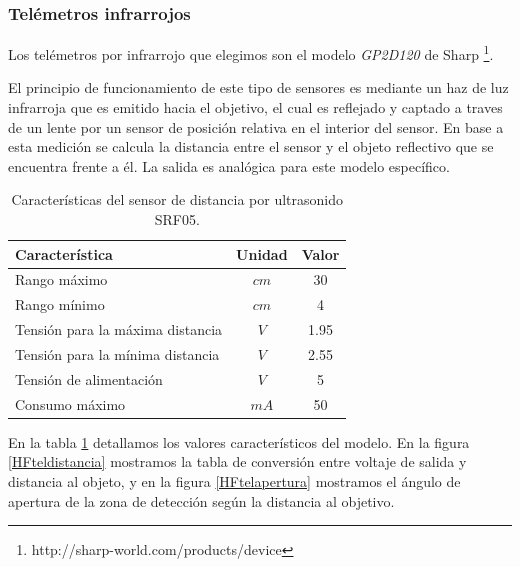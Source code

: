 \subsubsection{Tel\'emetros infrarrojos}
\label{HStelemetros}
	
	Los tel\'emetros por infrarrojo que elegimos son el modelo \emph{GP2D120} de Sharp \footnote{http://sharp-world.com/products/device}.
	
	El principio de funcionamiento de este tipo de sensores es mediante un haz de luz infrarroja que es emitido hacia el objetivo, el cual
	es reflejado y captado a traves de un lente por un sensor de posici\'on relativa en el interior del sensor. En base a esta medici\'on
	se calcula la distancia entre el sensor y el objeto reflectivo que se encuentra frente a \'el. La salida es anal\'ogica para este
	modelo espec\'ifico.
	
	\begin{table}[ht]
		\begin{center}
			\begin{tabular}{|l|c|c|}
				\hline
				Caracter\'istica & Unidad & Valor\\
				\hline
				Rango m\'aximo & $cm$ & 30 \\
				Rango m\'inimo & $cm$ & 4 \\
				Tensi\'on para la m\'axima distancia & $V$ & 1.95 \\
				Tensi\'on para la m\'inima distancia & $V$ & 2.55 \\
				Tensi\'on de alimentaci\'on & $V$ & 5 \\
				Consumo m\'aximo & $mA$ & 50 \\
				\hline
			\end{tabular}
		\end{center}
		\caption{Caracter\'isticas del sensor de distancia por ultrasonido SRF05.}
		\label{HTtel}
	\end{table}
	
	En la tabla \ref{HTtel} detallamos los valores caracter\'isticos del modelo. En la figura \ref{HFteldistancia} mostramos la tabla de
	conversi\'on entre voltaje de salida y distancia al objeto, y en la figura \ref{HFtelapertura} mostramos el \'angulo de apertura de
	la zona de detecci\'on seg\'un la distancia al objetivo.
	

